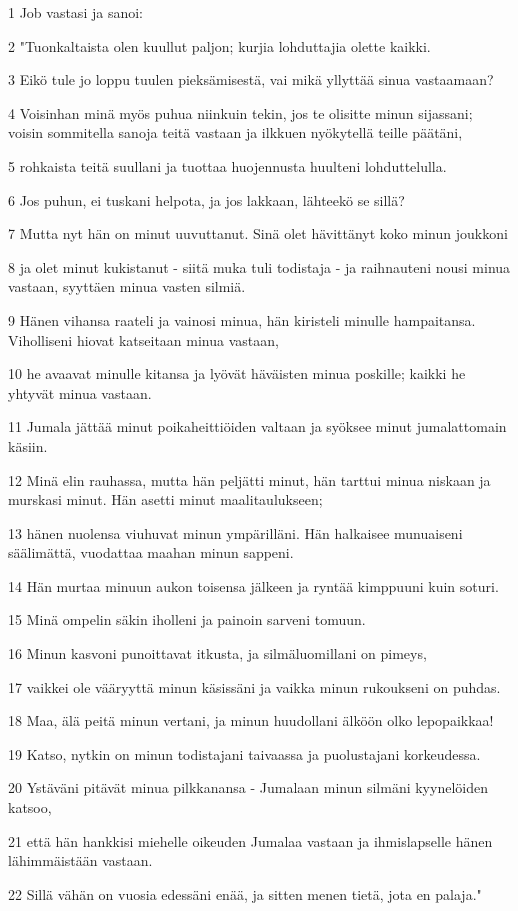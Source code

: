 \par 1 Job vastasi ja sanoi:
\par 2 "Tuonkaltaista olen kuullut paljon; kurjia lohduttajia olette kaikki.
\par 3 Eikö tule jo loppu tuulen pieksämisestä, vai mikä yllyttää sinua vastaamaan?
\par 4 Voisinhan minä myös puhua niinkuin tekin, jos te olisitte minun sijassani; voisin sommitella sanoja teitä vastaan ja ilkkuen nyökytellä teille päätäni,
\par 5 rohkaista teitä suullani ja tuottaa huojennusta huulteni lohduttelulla.
\par 6 Jos puhun, ei tuskani helpota, ja jos lakkaan, lähteekö se sillä?
\par 7 Mutta nyt hän on minut uuvuttanut. Sinä olet hävittänyt koko minun joukkoni
\par 8 ja olet minut kukistanut - siitä muka tuli todistaja - ja raihnauteni nousi minua vastaan, syyttäen minua vasten silmiä.
\par 9 Hänen vihansa raateli ja vainosi minua, hän kiristeli minulle hampaitansa. Viholliseni hiovat katseitaan minua vastaan,
\par 10 he avaavat minulle kitansa ja lyövät häväisten minua poskille; kaikki he yhtyvät minua vastaan.
\par 11 Jumala jättää minut poikaheittiöiden valtaan ja syöksee minut jumalattomain käsiin.
\par 12 Minä elin rauhassa, mutta hän peljätti minut, hän tarttui minua niskaan ja murskasi minut. Hän asetti minut maalitaulukseen;
\par 13 hänen nuolensa viuhuvat minun ympärilläni. Hän halkaisee munuaiseni säälimättä, vuodattaa maahan minun sappeni.
\par 14 Hän murtaa minuun aukon toisensa jälkeen ja ryntää kimppuuni kuin soturi.
\par 15 Minä ompelin säkin iholleni ja painoin sarveni tomuun.
\par 16 Minun kasvoni punoittavat itkusta, ja silmäluomillani on pimeys,
\par 17 vaikkei ole vääryyttä minun käsissäni ja vaikka minun rukoukseni on puhdas.
\par 18 Maa, älä peitä minun vertani, ja minun huudollani älköön olko lepopaikkaa!
\par 19 Katso, nytkin on minun todistajani taivaassa ja puolustajani korkeudessa.
\par 20 Ystäväni pitävät minua pilkkanansa - Jumalaan minun silmäni kyynelöiden katsoo,
\par 21 että hän hankkisi miehelle oikeuden Jumalaa vastaan ja ihmislapselle hänen lähimmäistään vastaan.
\par 22 Sillä vähän on vuosia edessäni enää, ja sitten menen tietä, jota en palaja."

